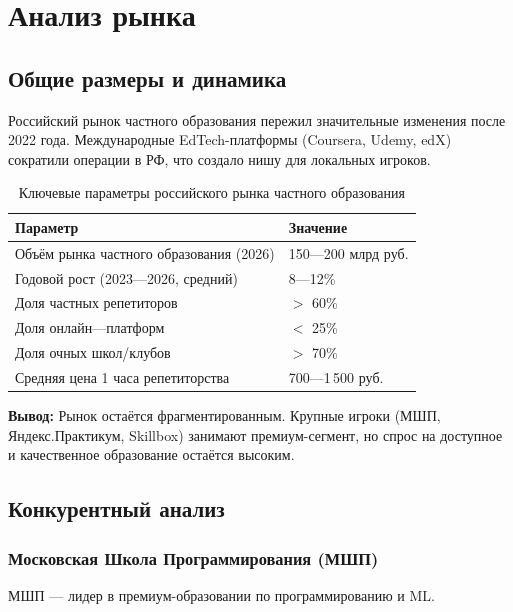 \documentclass[12pt,a4paper]{article}
\begin{document}
\section{Анализ рынка}

\subsection{Общие размеры и динамика}

Российский рынок частного образования пережил значительные изменения после 2022 года. Международные EdTech-платформы (Coursera, Udemy, edX) сократили операции в РФ, что создало нишу для локальных игроков.

\begin{table}[H]
\centering
\caption{Ключевые параметры российского рынка частного образования}
\label{tab:market_overview}
\begin{tabular}{ll}
\toprule
Параметр & Значение \\
\midrule
Объём рынка частного образования (2026) & 150---200 млрд руб. \\
Годовой рост (2023---2026, средний) & 8---12\% \\
Доля частных репетиторов & ${>}$ 60\% \\
Доля онлайн---платформ & ${<}$ 25\% \\
Доля очных школ/клубов & ${>}$ 70\% \\
Средняя цена 1 часа репетиторства & 700---1\,500 руб. \\
\bottomrule
\end{tabular}
\end{table}

\textbf{Вывод:} Рынок остаётся фрагментированным. Крупные игроки (МШП, Яндекс.Практикум, Skillbox) занимают премиум-сегмент, но спрос на доступное и качественное образование остаётся высоким.

\subsection{Конкурентный анализ}

\subsubsection{Московская Школа Программирования (МШП)}

МШП --- лидер в премиум-образовании по программированию и ML.
\end{document}
